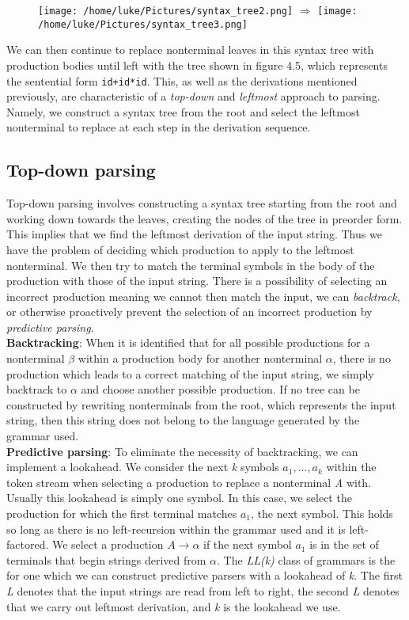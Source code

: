 \documentclass[a4paper, 11pt]{article}
\begin{document}
\begin{figure}[ht!]
	\centering
	\texttt{[image: /home/luke/Pictures/syntax\_tree2.png]}
	$\Rightarrow$
	\texttt{[image: /home/luke/Pictures/syntax\_tree3.png]}
\end{figure}

\noindent We can then continue to replace nonterminal leaves in this syntax tree with production bodies until left with the tree shown in figure 4.5, which represents the sentential form \texttt{id+id*id}. This, as well as the derivations mentioned previously, are characteristic of a \textit{top-down} and \textit{leftmost} approach to parsing. Namely, we construct a syntax tree from the root and select the leftmost nonterminal to replace at each step in the derivation sequence.

\subsection{Top-down parsing}
Top-down parsing involves constructing a syntax tree starting from the root and working down towards the leaves, creating the nodes of the tree in preorder form. This implies that we find the leftmost derivation of the input string. Thus we have the problem of deciding which production to apply to the leftmost nonterminal. We then try to match the terminal symbols in the body of the production with those of the input string. There is a possibility of selecting an incorrect production meaning we cannot then match the input, we can \textit{backtrack}, or otherwise proactively prevent the selection of an incorrect production by \textit{predictive parsing}.
\\\newline
\textbf{Backtracking}: When it is identified that for all possible productions for a nonterminal $\beta$ within a production body for another nonterminal $\alpha$, there is no production which leads to a correct matching of the input string, we simply backtrack to $\alpha$ and choose another possible production. If no tree can be constructed by rewriting nonterminals from the root, which represents the input string, then this string does not belong to the language generated by the grammar used.
\\\newline
\textbf{Predictive parsing}: To eliminate the necessity of backtracking, we can implement a lookahead. We consider the next \textit{k} symbols $a_1, ..., a_k$ within the token stream when selecting a production to replace a nonterminal \textit{A} with. Usually this lookahead is simply one symbol. In this case, we select the production for which the first terminal matches $a_{1}$, the next symbol. This holds so long as there is no left-recursion within the grammar used and it is left-factored. We select a production $\textit{A}\rightarrow\alpha$ if the next symbol $a_1$ is in the set of terminals that begin strings derived from $\alpha$. The \textit{LL(k)} class of grammars is the for one which we can construct predictive parsers with a lookahead of \textit{k}. The first \textit{L} denotes that the input strings are read from left to right, the second \textit{L} denotes that we carry out leftmost derivation, and \textit{k} is the lookahead we use.
\end{document}
